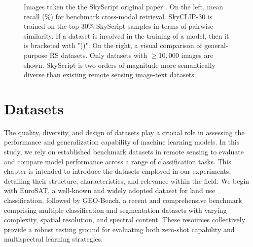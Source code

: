 \documentclass[a4paper, twoside, english]{sapthesis} %
\begin{document}
\begin{figure}[h]
    \centering
     \quad
\caption{Images taken the the SkyScript original paper \cite{wang2024skyscript}. On the left, mean recall (\%) for benchmark cross-modal retrieval. SkyCLIP-30 is trained on the top $30\%$ SkyScript samples in terms of pairwise similarity. If a dataset is involved in the training of a model, then it is bracketed with "()". On the right, a visual comparison of general-purpose RS datasets. Only datasets with $\ge 10,000$ images are shown. SkyScript is two orders of magnitude more semantically diverse than existing remote sensing image-text datasets.}
\label{fig:skyclip}
\end{figure}


\chapter{Datasets} %

The quality, diversity, and design of datasets play a crucial role in assessing the performance and generalization capability of machine learning models. In this study, we rely on established benchmark datasets in remote sensing to evaluate and compare model performance across a range of classification tasks. This chapter is intended to introduce the datasets employed in our experiments, detailing their structure, characteristics, and relevance within the field. We begin with EuroSAT, a well-known and widely adopted dataset for land use classification, followed by GEO-Bench, a recent and comprehensive benchmark comprising multiple classification and segmentation datasets with varying complexity, spatial resolution, and spectral content. These resources collectively provide a robust testing ground for evaluating both zero-shot capability and multispectral learning strategies.
\end{document}
